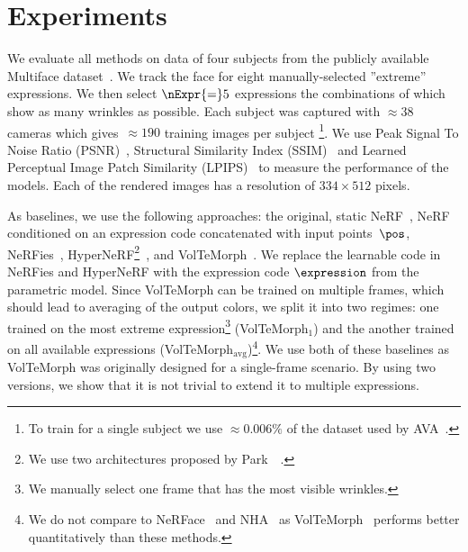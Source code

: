 % 




\section{Experiments}
  \label{sec:blendfields-experiments}

  We evaluate all methods on data of four subjects from the publicly available
  Multiface dataset~\cite{wuu2022multiface}.
  We track the face for eight manually-selected ''extreme'' expressions.
  We then select $\nExpr{=}5$ expressions the combinations of which show as
  many wrinkles as possible.
  Each subject was captured with $\approx\!
    \!38$ cameras which gives~$\approx\!\!190$ training images per subject
  \footnote{To train \blendfields for a single subject we use $\approx0.006\%$ of the dataset used by AVA~\cite{cao2022authentic}.}.
  We use Peak Signal To Noise Ratio (PSNR)~\cite{avcibas2002statistical},
  Structural Similarity Index (SSIM)~\cite{wang2003multiscale} and Learned
  Perceptual Image Patch Similarity (LPIPS)~\cite{zhang2018perceptual} to
  measure the performance of the models.
  Each of the rendered images has a resolution of $334{\times}512$ pixels.

  As baselines, we use the following approaches: the original, static
  NeRF~\cite{mildenhall2020nerf}, NeRF conditioned on an expression code
  concatenated with input points~$\pos$, NeRFies~\cite{park2021nerfies},
  HyperNeRF\footnote{We use two architectures proposed by
  Park~\etal~\cite{park2021hypernerf}.
  }~\cite{park2021hypernerf}, and VolTeMorph~\cite{garbin2024voltemorph}.
  We replace the learnable code in NeRFies and HyperNeRF with the expression
  code $\expression$ from the parametric model.
  Since VolTeMorph can be trained on multiple frames, which should lead to
  averaging of the output colors, we split it into two regimes: one trained on
  the most extreme expression\footnote{We manually select one frame that has
  the most visible wrinkles.
  } (VolTeMorph$_1$) and the another trained on all available expressions (VolTeMorph$_\text{avg}$)\footnote{We do not compare to NeRFace~\cite{gafni2021dynamic} and NHA~\cite{grassal2022neural} as VolTeMorph~\cite{garbin2024voltemorph} performs better quantitatively than these methods.}.
  We use both of these baselines as VolTeMorph was originally designed for a
  single-frame scenario.
  By using two versions, we show that it is not trivial to extend it to
  multiple expressions.

